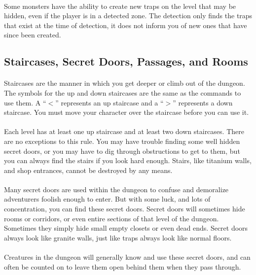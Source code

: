 \paragraph{}Some monsters have the ability to create new traps on the
level that may be hidden, even if the player is in a detected zone. The
detection only finds the traps that exist at the time of detection, it
does not inform you of new ones that have since been created.

\subsection{Staircases, Secret Doors, Passages, and Rooms}
\paragraph{}Staircases are the manner in which you get deeper or climb
out of the dungeon. The symbols for the up and down staircases are the
same as the commands to use them. A ``$<$'' represents an up staircase
and a ``$>$'' represents a down staircase. You must move your character
over the staircase before you can use it.

\paragraph{}Each level has at least one up staircase and at least two
down staircases.  There are no exceptions to this rule. You may have
trouble finding some well hidden secret doors, or you may have to dig
through obstructions to get to them, but you can always find the stairs
if you look hard enough. Stairs, like titanium walls, and shop
entrances, cannot be destroyed by any means.

\paragraph{}Many secret doors are used within the dungeon to confuse and
demoralize adventurers foolish enough to enter. But with some luck, and
lots of concentration, you can find these secret doors. Secret doors
will sometimes hide rooms or corridors, or even entire sections of that
level of the dungeon. Sometimes they simply hide small empty closets or
even dead ends.  Secret doors always look like granite walls, just like
traps always look like normal floors.

\paragraph{}Creatures in the dungeon will generally know and use these
secret doors, and can often be counted on to leave them open behind them
when they pass through.

